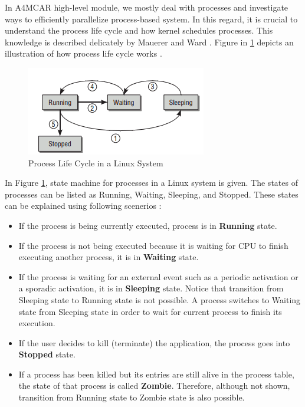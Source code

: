 In A4MCAR high-level module, we mostly deal with processes and investigate ways to efficiently parallelize process-based system. In this regard, it is crucial to understand the process life cycle and how kernel schedules processes. This knowledge is described delicately by Mauerer \cite{linuxkernelbook} and Ward \cite{howlinuxworksbook}. Figure in \ref{fig:processlifecycle} depicts an illustration of how process life cycle works \cite{linuxkernelbook}.
\begin{figure}[!ht]
	\centering
	\captionsetup{justification=centering}
	\includegraphics[scale=1]{content/images/processlifecycle.png}
	\caption{Process Life Cycle in a Linux System \cite{linuxkernelbook}}
	\label{fig:processlifecycle}
\end{figure}

In Figure \ref{fig:processlifecycle}, state machine for processes in a Linux system is given. The states of processes can be listed as Running, Waiting, Sleeping, and Stopped. These states can be explained using following scenerios \cite{linuxkernelbook}:
\begin{itemize}
	\item If the process is being currently executed, process is in \textbf{Running} state.
	\item If the process is not being executed because it is waiting for CPU to finish executing another process, it is in \textbf{Waiting} state.
	\item If the process is waiting for an external event such as a periodic activation or a sporadic activation, it is in \textbf{Sleeping} state. Notice that transition from Sleeping state to Running state is not possible. A process switches to Waiting state from Sleeping state in order to wait for current process to finish its execution.
	\item If the user decides to kill (terminate) the application, the process goes into \textbf{Stopped} state.
	\item If a process has been killed but its entries are still alive in the process table, the state of that process is called \textbf{Zombie}. Therefore, although not shown, transition from Running state to Zombie state is also possible.
\end{itemize}

